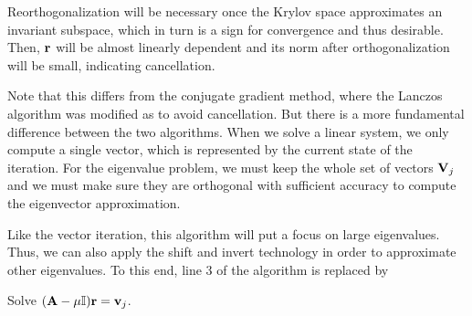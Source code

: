\begin{remark}
  Reorthogonalization will be necessary once the Krylov space
  approximates an invariant subspace, which in turn is a sign for
  convergence and thus desirable. Then, $\mathbf r$ will be almost linearly
  dependent and its norm after orthogonalization will be small,
  indicating cancellation.

  Note that this differs from the conjugate gradient method, where the
  Lanczos algorithm was modified as to avoid cancellation. But there
  is a more fundamental difference between the two algorithms. When we
  solve a linear system, we only compute a single vector, which is
  represented by the current state of the iteration. For the
  eigenvalue problem, we must keep the whole set of vectors $\mathbf V_j$
  and we must make sure they are orthogonal with sufficient accuracy
  to compute the eigenvector approximation.
\end{remark}

\begin{remark}
  Like the vector iteration, this algorithm will put a focus on large
  eigenvalues. Thus, we can also apply the shift and invert technology
  in order to approximate other eigenvalues. To this end, line 3 of
  the algorithm is replaced by
  \begin{algorithmic}
    \State Solve $(\mathbf A-\mu\mathbb I)\mathbf r = \mathbf v_j$.
  \end{algorithmic}
\end{remark}



